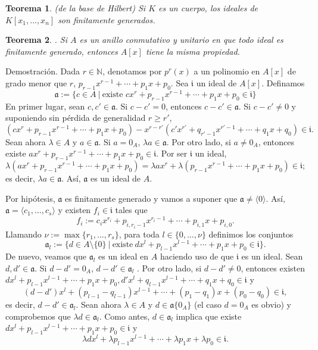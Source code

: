 \documentclass[a4paper,12pt]{article}
\newcommand{\N}{\mathbb{N}}
\newcommand{\af}{\mathfrak{a}}
\newtheorem{theorem}{Teorema}
\theoremstyle{definition}
\begin{document}
\begin{theorem} (de la base de Hilbert) Si $K$ es un cuerpo, los ideales de $K[x_1,\dots,x_n]$ son finitamente generados.
\end{theorem}

\begin{theorem}. Si $A$ es un anillo conmutativo y unitario en que todo ideal es finitamente generado, entonces $A[x]$ tiene la misma propiedad.
\end{theorem}

Demostración. Dada $r\in\N$, denotamos por $p^r(x)$ a un polinomio en $A[x]$ de grado menor que $r$, $p_{r-1}x^{r-1}+\cdots+p_1x+p_0$. Sea $\mathfrak{i}$ un ideal de $A[x]$. Definamos$$\af:=\{c\in A\ |\ \text{existe } cx^r+p_{r-1}x^{r-1}+\cdots+p_1x+p_0\in \mathfrak{i}\}$$En primer lugar, sean $c,c'\in\af$. Si $c-c'=0$, entonces $c-c'\in\af$. Si $c-c'\neq 0$ y suponiendo sin pérdida de generalidad $r\ge r'$, $$(cx^r+p_{r-1}x^{r-1}+\cdots+p_1x+p_0)-x^{r-r'}(c'x^{r'}+q_{r'-1}x^{r'-1}+\cdots+q_1x+q_0)\in \mathfrak{i}.$$
Sean ahora $\lambda\in A$ y $a\in\af$. Si $a=0_A$, $\lambda a\in\af$. Por otro lado, si $a\neq0_A$, entonces existe $ax^r+p_{r-1}x^{r-1}+\cdots+p_1x+p_0\in \mathfrak{i}$. Por ser $\mathfrak{i}$ un ideal,$$\lambda(ax^r+p_{r-1}x^{r-1}+\cdots+p_1x+p_0)=\lambda ax^r+\lambda(p_{r-1}x^{r-1}+\cdots+p_1x+p_0)\in \mathfrak{i};$$
es decir, $\lambda a\in\af$. Así, $\af$ es un ideal de $A$.

Por hipótesis, $\af$ es finitamente generado y vamos a suponer que $\af\neq\langle0\rangle$. Así, $\af=\langle c_1,\dots,c_s\rangle$ y existen $f_i\in \mathfrak{i}$ tales que$$f_i:=c_ix^{r_i}+p_{i,r_i-1}x^{r_i-1}+\cdots+p_{i,1}x+p_{i,0}.$$
Llamando $\nu:=\max\{r_1,\dots,r_s\}$, para toda $l\in\{0,\dots,\nu\}$ definimos los conjuntos$$\af_l:=\{d\in A\setminus\{0\}\ |\ \text{existe}\ dx^l+p_{l-1}x^{l-1}+\cdots+p_1x+p_0\in \mathfrak{i}\}.$$
De nuevo, veamos que $\af_l$ es un ideal en $A$ haciendo uso de que $\mathfrak{i}$ es un ideal. Sean $d,d'\in\af$. Si $d-d'=0_A$, $d-d'\in\af_l$ . Por otro lado, si $d-d'\neq 0$, entonces existen $dx^l+p_{l-1}x^{l-1}+\cdots+p_1x+p_0, d'x^l+q_{l-1}x^{l-1}+\cdots+q_1x+q_0\in \mathfrak{i}$ y$$(d-d')x^l+(p_{l-1}-q_{l-1})x^{l-1}+\cdots+(p_1-q_1)x+(p_0-q_0)\in \mathfrak{i},$$
es decir, $d-d'\in\af_l$. Sean ahora $\lambda\in A$ y $d\in\af\{0_A\}$ (el caso $d=0_A$ es obvio) y comprobemos que $\lambda d\in\af_l$. Como antes, $d\in\af_l$ implica que existe $dx^l+p_{l-1}x^{l-1}+\cdots+p_1x+p_0\in \mathfrak{i}$ y$$\lambda dx^l+\lambda p_{l-1}x^{l-1}+\cdots+\lambda p_1x+\lambda p_0\in \mathfrak{i}.$$
\end{document}
